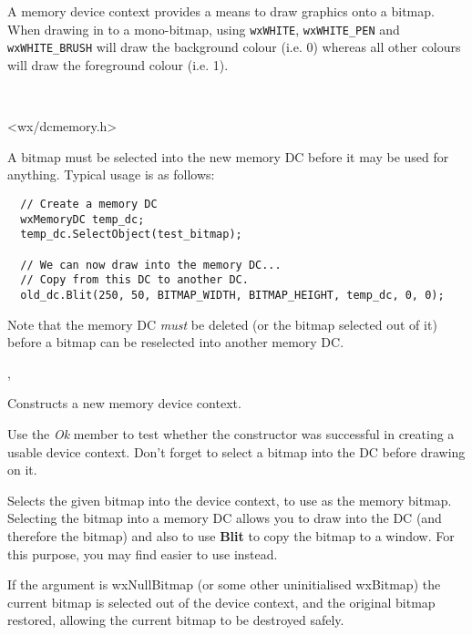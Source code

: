\section{}\label{wxmemorydc}

A memory device context provides a means to draw graphics onto a bitmap. When
drawing in to a mono-bitmap, using {\tt wxWHITE}, {\tt wxWHITE\_PEN} and
{\tt wxWHITE\_BRUSH}
will draw the background colour (i.e. 0) whereas all other colours will draw the
foreground colour (i.e. 1).


\\


<wx/dcmemory.h>


A bitmap must be selected into the new memory DC before it may be used
for anything.  Typical usage is as follows:

\begin{verbatim}
  // Create a memory DC
  wxMemoryDC temp_dc;
  temp_dc.SelectObject(test_bitmap);

  // We can now draw into the memory DC...
  // Copy from this DC to another DC.
  old_dc.Blit(250, 50, BITMAP_WIDTH, BITMAP_HEIGHT, temp_dc, 0, 0);
\end{verbatim}

Note that the memory DC {\it must} be deleted (or the bitmap selected out of it) before a bitmap
can be reselected into another memory DC.


, 


\label{wxmemorydcctor}


Constructs a new memory device context.

Use the {\it Ok} member to test whether the constructor was successful
in creating a usable device context. Don't forget to select a bitmap
into the DC before drawing on it.

\label{wxmemorydcselectobject}


Selects the given bitmap into the device context, to use as the memory
bitmap. Selecting the bitmap into a memory DC allows you to draw into
the DC (and therefore the bitmap) and also to use {\bf Blit} to copy
the bitmap to a window. For this purpose, you may find \rtfsp
easier to use instead.

If the argument is wxNullBitmap (or some other uninitialised wxBitmap) the current bitmap is selected out of the device
context, and the original bitmap restored, allowing the current bitmap to
be destroyed safely.

